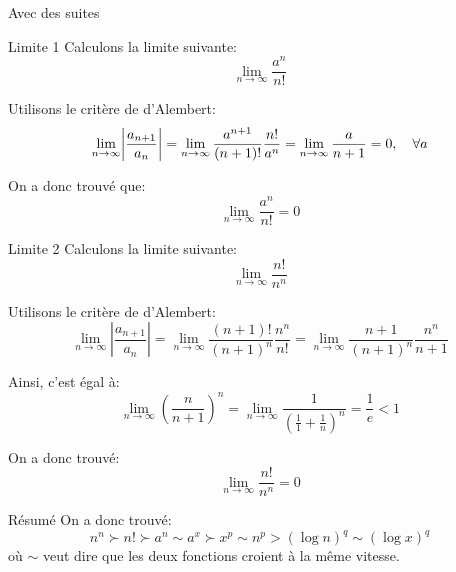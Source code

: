 \documentclass[a4paper]{article}
\begin{document}
\begin{parag}{Avec des suites}
    \begin{subparag}{Limite 1}
        Calculons la limite suivante:
        \[\lim_{n \to \infty} \frac{a^n}{n!}\]

        Utilisons le critère de d'Alembert: 
        \[\lim_{n \to \infty} \left|\frac{a_{n+1}}{a_n}\right| = \lim_{n \to \infty} \frac{a^{n+1}}{\left(n+1\right)!} \frac{n!}{a^n} = \lim_{n \to \infty} \frac{a}{n+1} = 0, \mathspace \forall a\]

        On a donc trouvé que:
        \[\lim_{n \to \infty} \frac{a^n}{n!} = 0\]

    \end{subparag}
    
    \begin{subparag}{Limite 2}
        Calculons la limite suivante:
        \[\lim_{n \to \infty} \frac{n!}{n^n}\]

        Utilisons le critère de d'Alembert: 
    \[\lim_{n \to \infty} \left|\frac{a_{n+1}}{a_n}\right| = \lim_{n \to \infty} \frac{\left(n+1\right)!}{\left(n+1\right)^n} \frac{n^n}{n!} = \lim_{n \to \infty} \frac{n+1}{\left(n+1\right)^n} \frac{n^n}{n+1}\]

        Ainsi, c'est égal à:
        \[\lim_{n \to \infty} \left(\frac{n}{n+1}\right)^n = \lim_{n \to \infty} \frac{1}{\left(\frac{1}{1} + \frac{1}{n}\right)^n} = \frac{1}{e} < 1\]
        
        On a donc trouvé: 
        \[\lim_{n \to \infty} \frac{n!}{n^n} = 0\]
    \end{subparag}
\end{parag}

\begin{parag}{Résumé}
    On a donc trouvé: 
    \[n^n \succ n! \succ a^n \sim a^x \succ x^p \sim n^p > \left(\log n\right)^q \sim \left(\log x\right)^q\]
    où $\sim$ veut dire que les deux fonctions croient à la même vitesse.
\end{parag}
\end{document}

